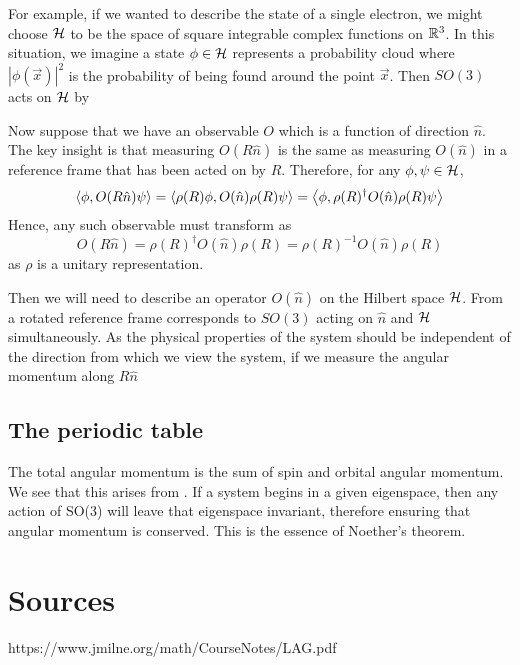 \documentclass[a4paper]{article}
\begin{document}
For example, if we wanted to describe the state of a single electron, we might choose $\mathcal{H}$ to be the space of square integrable complex functions on $\mathbb{R}^3$. In this situation, we imagine a state $\phi \in \mathcal{H}$ represents a probability cloud where $|\phi(\vec{x})|^2$ is the probability of being found around the point $\vec{x}$. Then $SO(3)$ acts on $\mathcal{H}$ by 

Now suppose that we have an observable $O$ which is a function of direction $\hat{n}$. The key insight is that measuring $O(R\hat{n})$ is the same as measuring $O(\hat{n})$ in a reference frame that has been acted on by $R$. Therefore, for any $\phi, \psi \in \mathcal{H}$, 
$$\left\langle \phi , O(R\hat{n})\psi \right\rangle = \left\langle \rho(R)\phi , O(\hat{n})\rho(R)\psi \right\rangle= \left\langle \phi , \rho(R)^\dagger O(\hat{n})\rho(R)\psi \right\rangle$$
Hence, any such observable must transform as  
$$O(R\hat{n}) = \rho(R)^\dagger O(\hat{n})\rho(R) = \rho(R)^{-1} O(\hat{n})\rho(R)$$
as $\rho$ is a unitary representation.

Then we will need to describe an operator $O(\hat{n})$ on the Hilbert space $\mathcal{H}$. From a rotated reference frame corresponds to $SO(3)$ acting on $\hat{n}$ and $\mathcal{H}$ simultaneously. As the physical properties of the system should be independent of the direction from which we view the system, if we measure the angular momentum along $R\hat{n}$

\subsection{The periodic table}

The total angular momentum is the sum of spin and orbital angular momentum. We see that this arises from . If a system begins in a given eigenspace, then any action of SO(3) will leave that eigenspace invariant, therefore ensuring that angular momentum is conserved. This is the essence of Noether's theorem.

\section{Sources}


https://www.jmilne.org/math/CourseNotes/LAG.pdf
\end{document}
